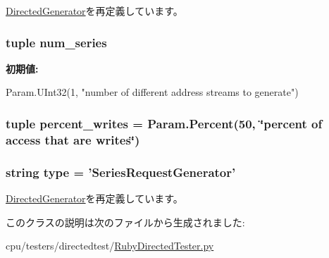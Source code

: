 \hyperlink{classRubyDirectedTester_1_1DirectedGenerator_a17da7064bc5c518791f0c891eff05fda}{DirectedGenerator}を再定義しています。\hypertarget{classRubyDirectedTester_1_1SeriesRequestGenerator_a01985ee594e57cc1f439c360d5ef908f}{
\subsubsection[{num\_\-series}]{\setlength{\rightskip}{0pt plus 5cm}tuple {\bf num\_\-series}}}
\label{classRubyDirectedTester_1_1SeriesRequestGenerator_a01985ee594e57cc1f439c360d5ef908f}
{\bfseries 初期値:}
\begin{DoxyCode}
Param.UInt32(1,
        "number of different address streams to generate")
\end{DoxyCode}
\hypertarget{classRubyDirectedTester_1_1SeriesRequestGenerator_af2b9cffec9f111436112603e85ff7b25}{
\subsubsection[{percent\_\-writes}]{\setlength{\rightskip}{0pt plus 5cm}tuple {\bf percent\_\-writes} = Param.Percent(50, \char`\"{}percent of access that are writes\char`\"{})}}
\label{classRubyDirectedTester_1_1SeriesRequestGenerator_af2b9cffec9f111436112603e85ff7b25}
\hypertarget{classRubyDirectedTester_1_1SeriesRequestGenerator_acce15679d830831b0bbe8ebc2a60b2ca}{
\subsubsection[{type}]{\setlength{\rightskip}{0pt plus 5cm}string {\bf type} = '{\bf SeriesRequestGenerator}'}}
\label{classRubyDirectedTester_1_1SeriesRequestGenerator_acce15679d830831b0bbe8ebc2a60b2ca}


\hyperlink{classRubyDirectedTester_1_1DirectedGenerator_acce15679d830831b0bbe8ebc2a60b2ca}{DirectedGenerator}を再定義しています。

このクラスの説明は次のファイルから生成されました:\begin{DoxyCompactItemize}
\item 
cpu/testers/directedtest/\hyperlink{RubyDirectedTester_8py}{RubyDirectedTester.py}\end{DoxyCompactItemize}
